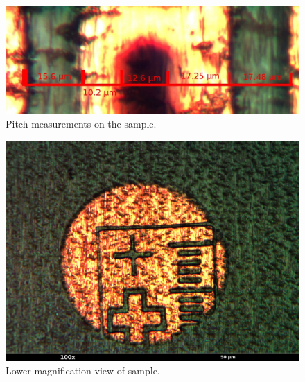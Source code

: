\documentclass[twocolumn]{article}
\begin{document}
\begin{figure}[h!]
\begin{center}
\includegraphics[scale=0.15]{mask009_annotated2.jpg}
\end{center}
\caption{Pitch measurements on the sample.}
\label{pitch}
\end{figure}

\begin{figure}[h!]
\begin{center}
\includegraphics[scale=0.06]{mask011_annotated.jpg}
\end{center}
\caption{Lower magnification view of sample.}
\label{lowmag}
\end{figure}
\end{document}

